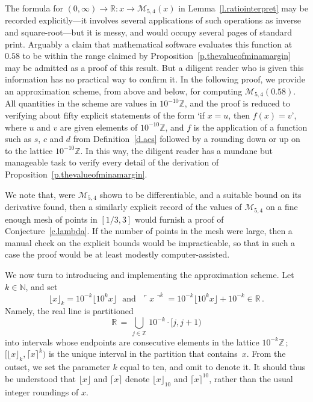 \documentclass[letterpaper,11pt,oneside,reqno]{amsbook}
\newcommand{\N}{\ensuremath{\mathbb{N}}}
\newcommand{\R}{\ensuremath{\mathbb{R}}}
\newcommand{\Z}{\ensuremath{\mathbb{Z}}}
\numberwithin{figure}{chapter}
\theoremstyle{definition}
\theoremstyle{definition}
\theoremstyle{definition}
\theoremstyle{definition}
\theoremstyle{definition}
\newcommand{\nwithzero}{\N}
\newcommand{\minamm}{\mathcal{M}}
\begin{document}
The formula for  $(0,\infty) \to \R: x \to \minamm_{5,4}(x)$ in Lemma~\ref{l.ratiointerpret} may be recorded explicitly---it involves several applications of such operations as inverse and square-root---but it is messy, and would occupy several pages of standard print. Arguably a claim that mathematical software evaluates this function at $0.58$ to be within the range claimed by Proposition~\ref{p.thevalueofminamargin} may be admitted as a proof of this result. But a diligent reader who is given this information has no practical way to confirm it. In the following proof, we provide an approximation scheme, from above and below, for computing $\minamm_{5,4}(0.58)$. All quantities in the scheme are values in $10^{-10}\Z$, and the proof is reduced to verifying about fifty explicit statements of the form `if $x=u$, then $f(x)=v$', where $u$ and $v$ are given elements of $10^{-10}\Z$, and $f$ is the application of a function such as $s$, $c$ and $d$ from Definition~\ref{d.acs}
followed by a rounding down or up on to the lattice $10^{-10}\Z$. In this way, the diligent reader has a mundane but manageable task to verify every detail of the derivation of Proposition~\ref{p.thevalueofminamargin}. 

We note that, were $\minamm_{5,4}$ shown to be differentiable, and a suitable bound on its derivative found, then a similarly explicit record of the values of $\minamm_{5,4}$ on a fine enough mesh of points in $[1/3,3]$
would furnish a proof of Conjecture~\ref{c.lambda}. If the number of points in the mesh were large, then a manual check on the explicit bounds would be impracticable, so that in such a case the proof would be at least modestly computer-assisted.

We now turn to introducing and implementing the approximation scheme.
Let  $k \in \nwithzero$, and set 
$$
 \lfloor x \rfloor_k  = 10^{-k} \lfloor 10^k x \rfloor  \, \, \, \, \textrm{and} \, \, \, \,  \ulcorner x \urcorner^k =  10^{-k} \lfloor 10^k x \rfloor  + 10^{-k} \in \R \, .
$$
Namely, the real line is partitioned 
$$
\R \, = \, \bigcup_{j \in \Z} \, 10^{-k} \cdot [j,j+1)
$$
into intervals whose endpoints are consecutive elements in the lattice $10^{-k}\Z\,$; 
 $\big[  \lfloor  x \rfloor_k , 
 \lceil x \rceil^k \big)$ is the unique interval in the partition that contains~$x$.
 From the outset, we set the parameter $k$ equal to ten, and omit to denote it. 
It should thus be understood that  $\lfloor  x \rfloor$ and  
 $\lceil x \rceil$ denote 
 $\lfloor  x \rfloor_{10}$ 
 and $\lceil x \rceil^{10}$, rather than the usual integer roundings of $x$. 
 
\end{document}
